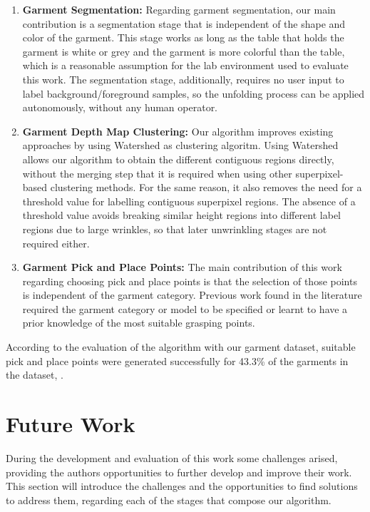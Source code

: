 \begin{enumerate}
	\item \textbf{Garment Segmentation:} Regarding garment segmentation, our main contribution is a segmentation stage that is independent of the shape and color of the garment. This stage works as long as the table that holds the garment is white or grey and the garment is more colorful than the table, which is a reasonable assumption for the lab environment used to evaluate this work. The segmentation stage, additionally, requires no user input to label background/foreground samples, so the unfolding process can be applied autonomously, without any human operator.
	\item \textbf{Garment Depth Map Clustering:} Our algorithm improves existing approaches by using Watershed as clustering algoritm. Using Watershed allows our algorithm to obtain the different contiguous regions directly, without the merging step that it is required when using other superpixel-based clustering methods. For the same reason, it also removes the need for a threshold value for labelling contiguous superpixel regions. The absence of a threshold value avoids breaking similar height regions into different label regions due to large wrinkles, so that later unwrinkling stages are not required either. 
	\item \textbf{Garment Pick and Place Points:} The main contribution of this work regarding choosing pick and place points is that the selection of those points is independent of the garment category. Previous work found in the literature required the garment category or model to be specified or learnt to have a prior knowledge of the most suitable grasping points.
\end{enumerate}

According to the evaluation of the algorithm with our garment dataset, suitable pick and place points were generated successfully for 43.3\% of the garments in the dataset, .

\section{Future Work}
\label{conclusions:future_work}
During the development and evaluation of this work some challenges arised, providing the authors opportunities to further develop and improve their work. This section will introduce the challenges and the opportunities to find solutions to address them, regarding each of the stages that compose our algorithm.

